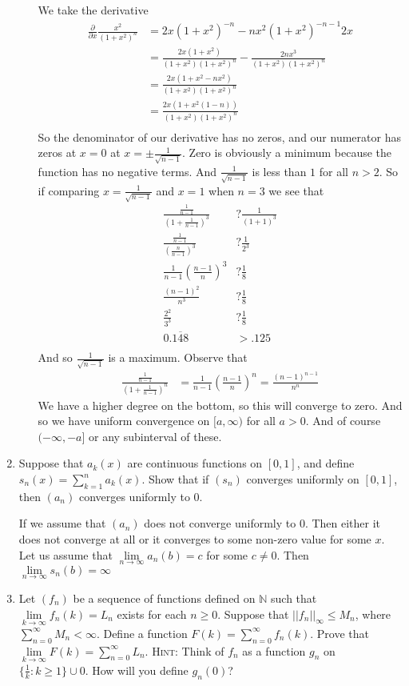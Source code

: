 \documentclass[letterpaper]{article}
\begin{document}
\begin{enumerate}
\begin{enumerate}
  We take the derivative 
  \begin{align*}
    \frac{\partial }{\partial x}\frac{x^2}{(1+x^2)^n}
    &=2x(1+x^2)^{-n}-nx^2(1+x^2)^{-n-1}2x\\
    &=\frac{2x(1+x^2)}{(1+x^2)(1+x^2)^{n}}-\frac{2nx^3}{(1+x^2)(1+x^2)^{n}}\\
    &=\frac{2x(1+x^2-nx^2)}{(1+x^2)(1+x^2)^{n}}\\
    &=\frac{2x(1+x^2(1-n))}{(1+x^2)(1+x^2)^{n}}\\
  \end{align*}
  So the denominator of our derivative has no zeros, and our numerator has zeros at $x=0$ at $x=\pm\frac{1}{\sqrt{n-1}}$. Zero is obviously a minimum because the function has no negative terms. And $\frac{1}{\sqrt{n-1}}$ is less than $1$ for all $n>2$. So if comparing $x=\frac{1}{\sqrt{n-1}}$ and $x=1$ when $n=3$ we see that
  \begin{align*}
    \frac{\frac{1}{n-1}}{(1+\frac{1}{n-1})^3}&?\frac{1}{(1+1)^3}\\
    \frac{\frac{1}{n-1}}{(\frac{n}{n-1})^3}&?\frac{1}{2^3}\\
    \frac{1}{n-1}\left(\frac{n-1}{n}\right)^3&?\frac{1}{8}\\
    \frac{(n-1)^2}{n^3}&?\frac{1}{8}\\
    \frac{2^2}{3^3}&?\frac{1}{8}\\
    0.\overline{148}&>.125\\
  \end{align*}
  And so $\frac{1}{\sqrt{n-1}}$ is a maximum. Observe that
  \begin{align*}
    \frac{\frac{1}{n-1}}{\left(1+\frac{1}{n-1}\right)^n}&=\frac{1}{n-1}\left(\frac{n-1}{n}\right)^n=\frac{(n-1)^{n-1}}{n^n}
  \end{align*}
  We have a higher degree on the bottom, so this will converge to zero. And so we have uniform convergence on $[a,\infty)$ for all $a>0$. And of course $(-\infty,-a]$ or any subinterval of these.
  \end{enumerate}
\setcounter{enumi}{7}
\item
Suppose that $a_k(x)$ are continuous functions on $[0,1]$, and define $s_n(x)=\sum\limits_{k=1}^n{a_k(x)}$. Show that if $(s_n)$ converges uniformly on $[0,1]$, then $(a_n)$ converges uniformly to $0$.

If we assume that $(a_n)$ does not converge uniformly to 0. Then either it does not converge at all or it converges to some non-zero value for some $x$. Let us assume that $\lim\limits_{n\to\infty}a_n(b)=c$ for some $c\ne 0$. Then $\lim\limits_{n\to\infty}s_n(b)=\infty$
\setcounter{enumi}{9}
\item
Let $(f_n)$ be a sequence of functions defined on $\mathbb{N}$ such that $\lim\limits_{k\to\infty}f_n(k)=L_n$ exists for each $n\ge 0$. Suppose that $||f_n||_\infty\le M_n$, where $\sum\limits_{n=0}^\infty{M_n}<\infty$. Define a function $F(k)=\sum\limits_{n=0}^\infty{f_n(k)}$. Prove that $\lim\limits_{k\to\infty}F(k)=\sum\limits_{n=0}^\infty{L_n}$.
{\scshape Hint:} Think of $f_n$ as a function $g_n$ on $\{\frac{1}{k}:k\ge 1\}\cup{0}$. How will you define $g_n(0)$?
\end{enumerate}
\end{document}
